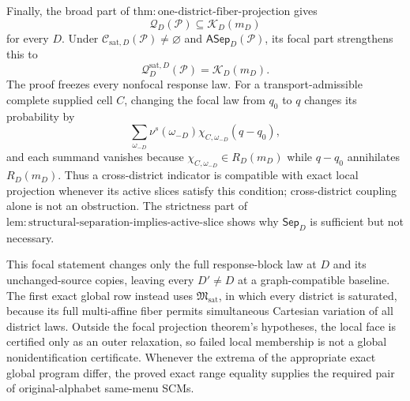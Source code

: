 Finally, the broad part of \(\mathrm{thm:one\text{-}district\text{-}fiber\text{-}projection}\) gives
\[
\mathcal Q_D(\mathcal P)\subseteq\mathcal K_D(m_D)
\]
for every \(D\).  Under \(\mathcal C_{\mathrm{sat},D}(\mathcal P)\ne\varnothing\) and \(\mathsf{ASep}_D(\mathcal P)\), its focal part strengthens this to
\[
\mathcal Q_D^{\mathrm{sat},D}(\mathcal P)=\mathcal K_D(m_D).
\]
The proof freezes every nonfocal response law.  For a transport-admissible complete supplied cell \(C\), changing the focal law from \(q_0\) to \(q\) changes its probability by
\[
\sum_{\omega_{-D}}\nu^s(\omega_{-D})
\chi_{C,\omega_{-D}}(q-q_0),
\]
and each summand vanishes because \(\chi_{C,\omega_{-D}}\in R_D(m_D)\) while \(q-q_0\) annihilates \(R_D(m_D)\).  Thus a cross-district indicator is compatible with exact local projection whenever its active slices satisfy this condition; cross-district coupling alone is not an obstruction.  The strictness part of \(\mathrm{lem:structural\text{-}separation\text{-}implies\text{-}active\text{-}slice}\) shows why \(\mathsf{Sep}_D\) is sufficient but not necessary.

This focal statement changes only the full response-block law at \(D\) and its unchanged-source copies, leaving every \(D'\ne D\) at a graph-compatible baseline.  The first exact global row instead uses \(\mathfrak M_{\mathrm{sat}}\), in which every district is saturated, because its full multi-affine fiber permits simultaneous Cartesian variation of all district laws.  Outside the focal projection theorem's hypotheses, the local face is certified only as an outer relaxation, so failed local membership is not a global nonidentification certificate.  Whenever the extrema of the appropriate exact global program differ, the proved exact range equality supplies the required pair of original-alphabet same-menu SCMs.